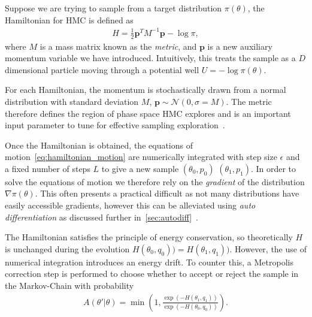 \documentclass[11pt]{article}
\begin{document}
    Suppose we are trying to sample from a target distribution $\pi(\theta)$, the Hamiltonian for HMC is defined as
    \begin{equation}\label{eq:hmc_hamiltonian}
    \begin{aligned}
        H = \frac{1}{2} \mathbf{p}^T M^{-1} \mathbf{p} - \log \pi,
    \end{aligned}
    \end{equation}
    where $M$ is a mass matrix known as the \emph{metric}, and $\mathbf{p}$ is a new auxiliary momentum variable we have introduced.
    Intuitively, this treats the sample as a $D$ dimensional particle moving through a potential well $U = -\log \pi(\theta)$.

    For each Hamiltonian, the momentum is stochastically drawn from a normal distribution with
    standard deviation $M$, $\mathbf{p} \sim \mathcal{N}(0, \sigma = M)$.
    The metric therefore defines the region of phase space HMC explores and is an important input parameter to
    tune for effective sampling exploration~\cite{betancourt2016energymetric}.

    Once the Hamiltonian is obtained, the equations of motion~\ref{eq:hamiltonian_motion} are numerically integrated
    with step size $\epsilon$ and a fixed number of steps $L$ to give a new
    sample $(\theta_0, p_0)$ \rightarrow $(\theta_1, p_1)$.
    In order to solve the equations of motion we therefore rely on the \emph{gradient} of the
    distribution $\nabla \pi(\theta)$.
    This often presents a practical difficult as not many distributions have easily accessible gradients, however this
    can be alleviated using \emph{auto differentiation} as discussed further in~\ref{sec:autodiff}~\cite{carpenter2015stan}.

    The Hamiltonian satisfies the principle of energy conservation, so theoretically $H$ is unchanged during
    the evolution $H(\theta_0, q_0)) = H(\theta_1, q_1))$.
    However, the use of numerical integration introduces an energy drift.
    To counter this, a Metropolis correction step is performed to choose whether to accept or reject the sample in
    the Markov-Chain with probability
    \begin{equation}\label{eq:hmc_accept_prob}
    \begin{aligned}
        A(\theta' | \theta) = \min \left(1, \frac{\exp(-H(\theta_1, q_1)) }{\exp(-H(\theta_0, q_0)) } \right).
    \end{aligned}
    \end{equation}
\end{document}
